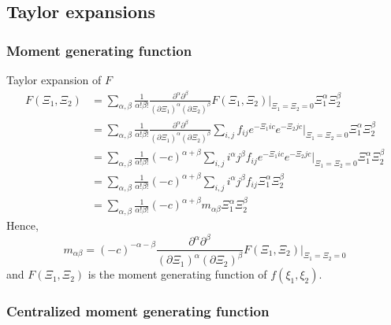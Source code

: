 \documentclass{article}
\begin{document}
\subsection{Taylor expansions}
\label{sub:Taylor expansions}

\subsubsection{Moment generating function}
\label{subs:Moment generating function}

Taylor expansion of $F$
\begin{equation}
  \label{eq: taylor of F}
  \begin{aligned}
    F(\Xi_1, \Xi_2) & = \sum_{\alpha,\beta} \frac{1}{\alpha!\beta!} \frac{\partial^\alpha\partial^\beta}{{(\partial \Xi_1)}^\alpha{(\partial \Xi_2)}^\beta} F(\Xi_1, \Xi_2)\Bigr|_{\Xi_1=\Xi_2 = 0} \Xi_1^\alpha \Xi_2^\beta \\
    & = \sum_{\alpha,\beta} \frac{1}{\alpha!\beta!} \frac{\partial^\alpha\partial^\beta}
      {{(\partial \Xi_1)}^\alpha{(\partial \Xi_2)}^\beta}  \sum_{i,j}f_{ij} e^{-\Xi_1 ic} e^{-\Xi_2 jc} \Bigr|_{\Xi_1=\Xi_2 = 0} \Xi_1^\alpha \Xi_2^\beta \\
    & = \sum_{\alpha,\beta} \frac{1}{\alpha!\beta!} {(-c)}^{\alpha+\beta}  \sum_{i,j} i^\alpha j^\beta f_{ij} e^{-\Xi_1 ic} e^{-\Xi_2 jc} \Bigr|_{\Xi_1=\Xi_2 = 0} \Xi_1^\alpha \Xi_2^\beta \\
    & = \sum_{\alpha,\beta} \frac{1}{\alpha!\beta!} {(-c)}^{\alpha+\beta}  \sum_{i,j} i^\alpha j^\beta f_{ij} \Xi_1^\alpha \Xi_2^\beta \\
    & = \sum_{\alpha,\beta} \frac{1}{\alpha!\beta!} {(-c)}^{\alpha+\beta}  m_{\alpha\beta} \Xi_1^\alpha \Xi_2^\beta
  \end{aligned}
\end{equation}
%
Hence,
\begin{equation}
  \label{eq:alternative representation of moments}
  m_{\alpha\beta} = {(-c)}^{-\alpha-\beta} \frac{\partial^\alpha\partial^\beta}{{(\partial \Xi_1)}^\alpha{(\partial \Xi_2)}^\beta} F(\Xi_1, \Xi_2)\Bigr|_{\Xi_1=\Xi_2 = 0}
\end{equation}
and $F(\Xi_1, \Xi_2)$ is the moment generating function of $f(\xi_1, \xi_2)$.

\subsubsection{Centralized moment generating function}
\label{subs:Centralized moment generating function}
\end{document}
